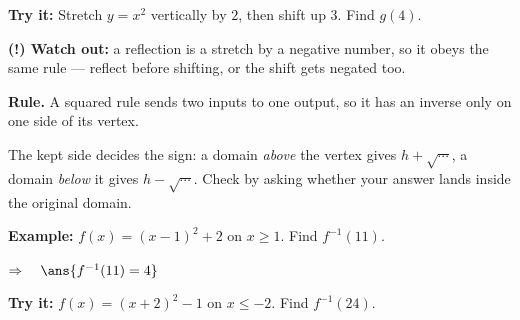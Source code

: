 \documentclass[12pt]{article}
\begin{document}
\begin{tryitbox}
\textbf{Try it:} \quad Stretch $y = x^{2}$ vertically by $2$, then shift up $3$. Find $g(4)$.\\[2pt]
\end{tryitbox}

\begin{watchoutbox}
\textbf{(!) Watch out:} a reflection is a stretch by a negative number, so it obeys the same rule --- reflect before shifting, or the shift gets negated too.
\end{watchoutbox}


\begin{formulabox}
\textbf{Rule.} A squared rule sends two inputs to one output, so it has an inverse only on one side of its vertex.\par
The kept side decides the sign: a domain \emph{above} the vertex gives $h + \sqrt{\cdots}$, a domain \emph{below} it gives $h - \sqrt{\cdots}$. Check by asking whether your answer lands inside the original domain.
\end{formulabox}

\begin{examplebox}
\textbf{Example:} \quad $f(x) = (x-1)^{2} + 2$ on $x \geq 1$. Find $f^{-1}(11)$.

$\Rightarrow\quad \ans{f^{-1}(11) = 4}$
\end{examplebox}

\begin{tryitbox}
\textbf{Try it:} \quad $f(x) = (x+2)^{2} - 1$ on $x \leq -2$. Find $f^{-1}(24)$.\\[2pt]
\end{tryitbox}
\end{document}

